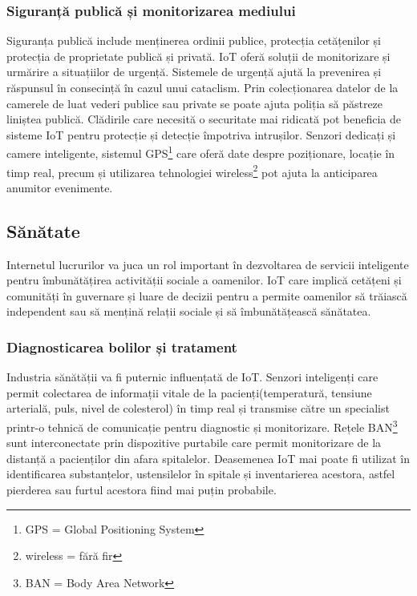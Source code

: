 \documentclass[12pt,a4paper]{report}
\begin{document}
\subsubsection{Siguranță publică și monitorizarea mediului}
Siguranța publică include menținerea ordinii publice, protecția cetățenilor și protecția de proprietate publică și privată. IoT oferă soluții de monitorizare și urmărire a situațiilor de urgență. Sistemele de urgență ajută la prevenirea și răspunsul în consecință în cazul unui cataclism. Prin colecționarea datelor de la camerele de luat vederi publice sau private se poate ajuta poliția să păstreze liniștea publică. Clădirile care necesită o securitate mai ridicată pot beneficia de sisteme IoT pentru protecție și detecție împotriva intrușilor. Senzori dedicați și camere inteligente,  sistemul GPS\footnote{GPS = Global Positioning System} care oferă date despre poziționare, locație în timp real, precum și utilizarea tehnologiei wireless\footnote{wireless = fără fir} pot ajuta la anticiparea anumitor evenimente.

\subsection{Sănătate}
Internetul lucrurilor va juca un rol important în dezvoltarea de servicii inteligente pentru îmbunătățirea activității sociale a oamenilor. IoT care implică cetățeni și comunități în guvernare și luare de decizii pentru a permite oamenilor să trăiască independent sau să mențină relații sociale și să îmbunătățească sănătatea.

\subsubsection{Diagnosticarea bolilor și tratament}
Industria sănătății va fi puternic influențată de IoT. Senzori inteligenți care permit colectarea de informații vitale de la pacienți(temperatură, tensiune arterială, puls, nivel de colesterol) în timp real  și transmise către un specialist printr-o tehnică de comunicație pentru diagnostic și monitorizare. Rețele BAN\footnote{BAN = Body Area Network} sunt interconectate prin dispozitive purtabile care permit monitorizare de la distanță a pacienților din afara spitalelor. Deasemenea IoT mai poate fi utilizat în identificarea substanțelor, ustensilelor în spitale și inventarierea acestora, astfel pierderea sau furtul acestora fiind mai puțin probabile.
\end{document}
